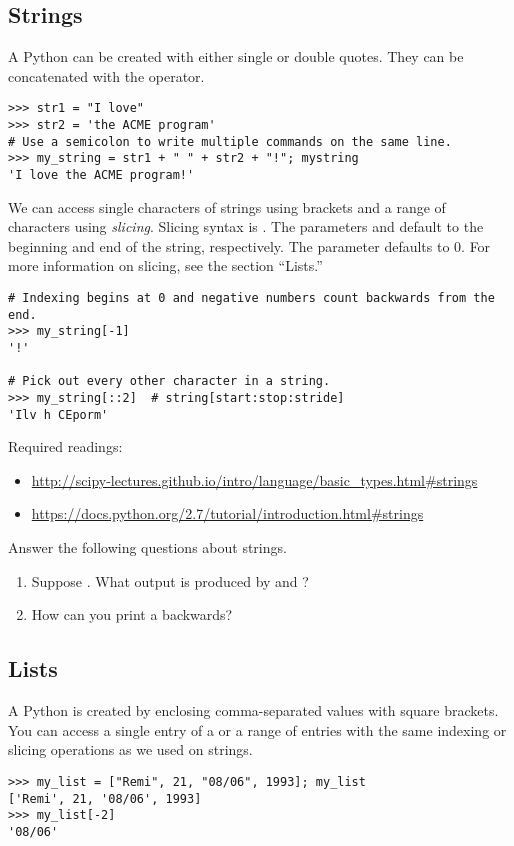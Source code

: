 \subsection*{Strings}
A Python  can be created with either single or double quotes. They can be concatenated with the \li{+} operator.
\begin{lstlisting}
>>> str1 = "I love"
>>> str2 = 'the ACME program'
# Use a semicolon to write multiple commands on the same line.
>>> my_string = str1 + " " + str2 + "!"; mystring
'I love the ACME program!'
\end{lstlisting}

We can access single characters of strings using brackets and a range of characters using \emph{slicing}. Slicing syntax is . The parameters  and  default to the beginning and end of the string, respectively. The parameter  defaults to 0. For more information on slicing, see the section ``Lists.''

\begin{lstlisting}
# Indexing begins at 0 and negative numbers count backwards from the end.
>>> my_string[-1]
'!'

# Pick out every other character in a string.
>>> my_string[::2]	# string[start:stop:stride]
'Ilv h CEporm'
\end{lstlisting}

Required readings: 
\begin{itemize}
\item \url{http://scipy-lectures.github.io/intro/language/basic_types.html#strings}
\item \url{https://docs.python.org/2.7/tutorial/introduction.html#strings}
\end{itemize}

\begin{problem}
Answer the following questions about strings.
\begin{enumerate}
\item Suppose . What output is produced by  and ? 
\item How can you print a  backwards?
\end{enumerate}
\end{problem}


\subsection*{Lists}
A Python  is created by enclosing comma-separated values with square brackets. You can access a single entry of a  or a range of entries with the same indexing or slicing operations as we used on strings. 
\begin{lstlisting}
>>> my_list = ["Remi", 21, "08/06", 1993]; my_list
['Remi', 21, '08/06', 1993]
>>> my_list[-2]
'08/06'
\end{lstlisting}

